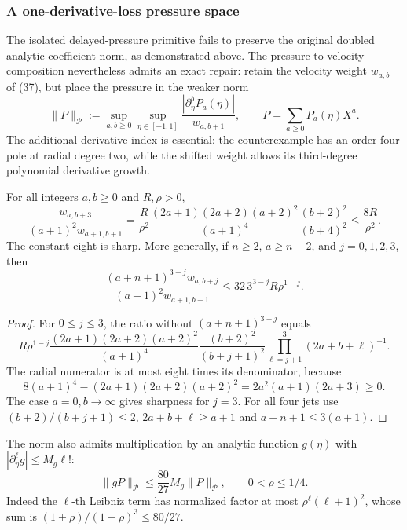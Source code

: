 \subsubsection*{A one-derivative-loss pressure space}
\label{subsec:shifted-pressure-repair}
The isolated delayed-pressure primitive fails to preserve the
original doubled analytic coefficient norm, as demonstrated above.
The pressure-to-velocity composition nevertheless admits an exact
repair: retain the velocity weight $w_{a,b}$ of (37), but place
the pressure in the weaker norm
\begin{equation}\label{eq:shifted-P-norm}
 \|P\|_{\mathcal P}:=\sup_{a,b\ge0}\sup_{\eta\in[-1,1]}
 \frac{|\partial_\eta^bP_a(\eta)|}{w_{a,b+1}},
 \qquad P=\sum_{a\ge0}P_a(\eta)X^a .
\end{equation}
The additional derivative index is essential: the counterexample
has an order-four pole at radial degree two, while the shifted
weight allows its third-degree polynomial derivative growth.

\begin{lemma}\label{lem:pressure-three-jet}
For all integers $a,b\ge0$ and $R,\rho>0$,
\begin{equation}\label{eq:shifted-exact-ratio}
 \frac{w_{a,b+3}}{(a+1)^2w_{a+1,b+1}}
 =\frac R{\rho^2}
 \frac{(2a+1)(2a+2)(a+2)^2}{(a+1)^4}
 \frac{(b+2)^2}{(b+4)^2}
 \le\frac{8R}{\rho^2}.
\end{equation}
The constant eight is sharp. More generally, if $n\ge2$,
$a\ge n-2$, and $j=0,1,2,3$, then
\begin{equation}\label{eq:shifted-four-slot}
 \frac{(a+n+1)^{3-j}w_{a,b+j}}
 {(a+1)^2w_{a+1,b+1}}
 \le32\,3^{3-j}R\rho^{1-j}.
\end{equation}
\end{lemma}
\begin{proof}
For $0\le j\le3$, the ratio without $(a+n+1)^{3-j}$
equals
\[
 R\rho^{1-j}\frac{(2a+1)(2a+2)(a+2)^2}{(a+1)^4}
 \frac{(b+2)^2}{(b+j+1)^2}
 \prod_{\ell=j+1}^{3}(2a+b+\ell)^{-1}.
\]
The radial numerator is at most eight times its denominator,
because
\[
8(a+1)^4-(2a+1)(2a+2)(a+2)^2
=2a^2(a+1)(2a+3)\ge0.
\]
The case $a=0,b\to\infty$ gives sharpness for $j=3$.
For all four jets use $(b+2)/(b+j+1)\le2$,
$2a+b+\ell\ge a+1$ and $a+n+1\le3(a+1)$.
\end{proof}
The norm also admits multiplication by an analytic function
$g(\eta)$ with $|\partial_\eta^\ell g|\le M_g\ell!$:
\begin{equation}\label{eq:P-multiplier}
 \|gP\|_{\mathcal P}\le\frac{80}{27}M_g\|P\|_{\mathcal P},
 \qquad 0<\rho\le1/4.
\end{equation}
Indeed the $\ell$-th Leibniz term has normalized factor at most
$\rho^\ell(\ell+1)^2$, whose sum is
$(1+\rho)/(1-\rho)^3\le80/27$.

